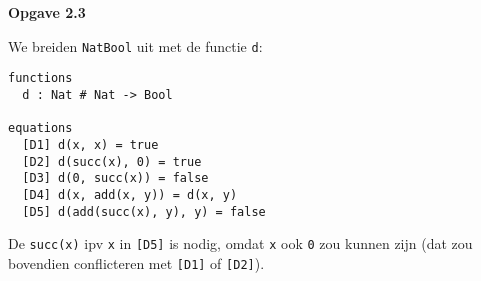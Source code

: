 \documentclass[a4paper,11pt]{article}
\begin{document}
{\bf Opgave 2.3} %

We breiden \verb|NatBool| uit met de functie \verb|d|:

\begin{verbatim}
functions
  d : Nat # Nat -> Bool

equations
  [D1] d(x, x) = true
  [D2] d(succ(x), 0) = true
  [D3] d(0, succ(x)) = false
  [D4] d(x, add(x, y)) = d(x, y)
  [D5] d(add(succ(x), y), y) = false
\end{verbatim}

De \verb|succ(x)| ipv \verb|x| in \verb|[D5]| is nodig, omdat \verb|x| ook
\verb|0| zou kunnen zijn (dat zou bovendien conflicteren met \verb|[D1]| of \verb|[D2]|).
\end{document}
